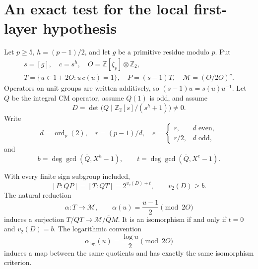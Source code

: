\section{An exact test for the local first-layer hypothesis}
\label{sec:cm-exact-first-layer}
Let \(p\ge5\), \(h=(p-1)/2\), and let \(g\) be a primitive residue
modulo \(p\).  Put
\[
 \begin{gathered}
 s=[g],\quad c=s^h,\quad O=\mathbb Z[\zeta_p]\otimes\mathbb Z_2,\\
 T=\{u\in1+2O:u\,c(u)=1\},\quad P=(s-1)T,\quad
 \mathscr M=(O/2O)^c.
 \end{gathered}
\]
Operators on unit groups are written additively, so
\((s-1)u=s(u)u^{-1}\).
Let \(Q\) be the integral CM operator, assume \(Q(1)\) is odd, and
assume
\[
 D=\det\bigl(Q\mid\mathbb Z_2[s]/(s^h+1)\bigr)\ne0.
\]
Write
\[
 d=\operatorname{ord}_p(2),\quad r=(p-1)/d,\quad
 e=\begin{cases}r,&d\text{ even},\\ r/2,&d\text{ odd},\end{cases}
\]
and
\[
 b=\deg\gcd(\overline Q,X^h-1),\qquad
 t=\deg\gcd(\overline Q,X^e-1).
\]

\begin{proposition}\label{prop:cm-exact-first-layer}
With every finite sign subgroup included,
\[
 [P:QP]=[T:QT]=2^{v_2(D)+t},\qquad v_2(D)\ge b.
\]
The natural reduction
\[
 \alpha:T\longrightarrow \mathscr M,\qquad
 \alpha(u)=\frac{u-1}{2}\pmod{2O}
\]
induces a surjection \(T/QT\to \mathscr M/\overline QM\).  It is an isomorphism
if and only if \(t=0\) and \(v_2(D)=b\).
The logarithmic convention
\[
 \alpha_{\log}(u)=\frac{\log u}{2}\pmod{2O}
\]
induces a map between the same quotients and has exactly the same
isomorphism criterion.
\end{proposition}

